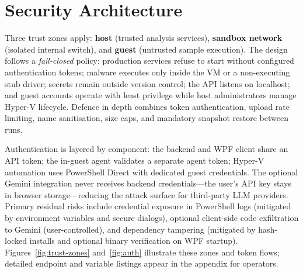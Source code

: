



\FloatBarrier
\section{Security Architecture}
\label{sec:seguranca}

Three trust zones apply: \textbf{host} (trusted analysis services), \textbf{sandbox network}
(isolated internal switch), and \textbf{guest} (untrusted sample execution). The design follows a
\emph{fail-closed} policy: production services refuse to start without configured authentication
tokens; malware executes only inside the VM or a non-executing stub driver; secrets remain outside
version control; the API listens on localhost; and guest accounts operate with least privilege while
host administrators manage Hyper-V lifecycle. Defence in depth combines token authentication, upload
rate limiting, name sanitisation, size caps, and mandatory snapshot restore between runs.

Authentication is layered by component: the backend and WPF client share an API token; the in-guest
agent validates a separate agent token; Hyper-V automation uses PowerShell Direct with dedicated
guest credentials. The optional Gemini integration never receives backend credentials---the user's
API key stays in browser storage---reducing the attack surface for third-party LLM providers.
Primary residual risks include credential exposure in PowerShell logs (mitigated by environment
variables and secure dialogs), optional client-side code exfiltration to Gemini (user-controlled),
and dependency tampering (mitigated by hash-locked installs and optional binary verification on
WPF startup). Figures~\ref{fig:trust-zones} and~\ref{fig:auth} illustrate these zones and token
flows; detailed endpoint and variable listings appear in the appendix for operators.

